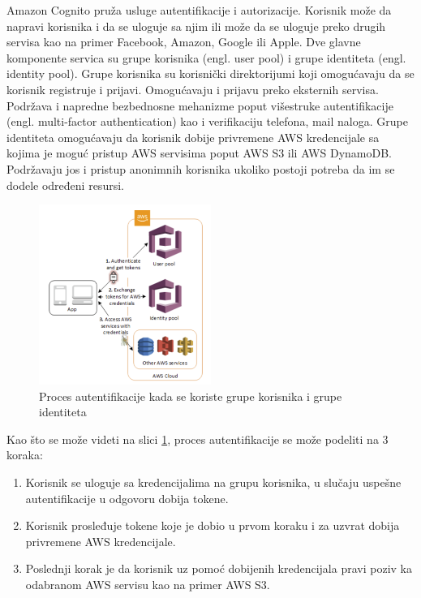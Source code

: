 \documentclass[12pt,oneside]{memoir}
\begin{document}
Amazon Cognito pruža usluge autentifikacije i autorizacije. Korisnik može da napravi korisnika i da se uloguje sa njim ili može da se uloguje preko drugih servisa kao na primer Facebook, Amazon, Google ili Apple. Dve glavne komponente servica su grupe korisnika (engl. user pool) i grupe identiteta (engl. identity pool). Grupe korisnika su korisnički direktorijumi koji omogućavaju da se korisnik registruje i prijavi. Omogućavaju i prijavu preko eksternih servisa. Podržava i napredne bezbednosne mehanizme poput višestruke autentifikacije (engl. multi-factor authentication) kao i verifikaciju telefona, mail naloga. Grupe identiteta omogućavaju da korisnik dobije privremene AWS kredencijale sa kojima je moguć pristup AWS servisima poput AWS S3 ili AWS DynamoDB. Podržavaju jos i pristup anonimnih korisnika ukoliko postoji potreba da im se dodele određeni resursi.


\begin{figure}[!ht]
  \centering
  \includegraphics[width=0.5\textwidth]{ProcesAutentifikacije.png}
  \caption{Proces autentifikacije kada se koriste grupe korisnika i grupe identiteta}
  \label{fig:procesAutentifikacije}
\end{figure}

Kao što se može videti na slici \ref{fig:procesAutentifikacije}, proces autentifikacije se može podeliti na 3 koraka:
\begin{enumerate}
  \item Korisnik se uloguje sa kredencijalima na grupu korisnika, u slučaju uspešne autentifikacije u odgovoru dobija tokene.
  \item Korisnik prosleđuje tokene koje je dobio u prvom koraku i za uzvrat dobija privremene AWS kredencijale.
  \item Poslednji korak je da korisnik uz pomoć dobijenih kredencijala pravi poziv ka odabranom AWS servisu kao na primer AWS S3.
\end{enumerate}
\end{document}
